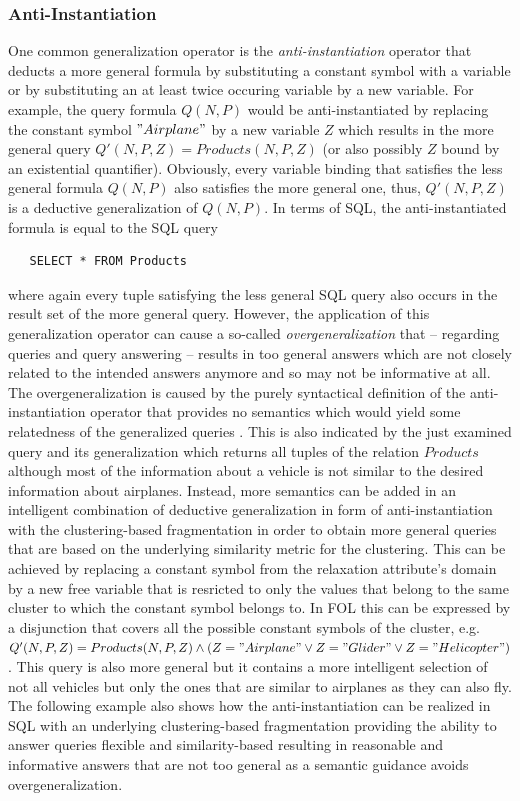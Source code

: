 \subsubsection{Anti-Instantiation}
\label{sec:meth_fqa_anti}
One common generalization operator is the \emph{anti-instantiation} operator \citep{Wiese2014} that deducts a more general formula by substituting a
constant symbol with a variable or by substituting an at least twice occuring variable by a new variable. For example, the query formula $Q(N,P)$ would 
be anti-instantiated by replacing the constant symbol $"Airplane"$ by a new variable $Z$ which results in the more general query
$Q'(N,P,Z)=Products(N,P,Z)$ (or also possibly $Z$ bound by an existential quantifier). Obviously, every variable binding that satisfies the less general
formula $Q(N,P)$ also satisfies the more general one, thus, $Q'(N,P,Z)$ is a deductive generalization of $Q(N,P)$. In terms of SQL, the anti-instantiated
formula is equal to the SQL query 
\begin{verbatim}
   SELECT * FROM Products 
\end{verbatim}
where again every tuple satisfying the less general SQL query also occurs in the result set of the more general query. However, the application of this
generalization operator can cause a so-called \emph{overgeneralization} \citep{Wiese2014} that -- regarding queries and query answering -- results in 
too general answers which are not closely related to the intended answers anymore and so may not be informative at all. The overgeneralization is caused by
the purely syntactical definition of the anti-instantiation operator that provides no semantics which would yield some relatedness of the generalized 
queries \citep{Wiese2014}. This is also indicated by the just examined query and its generalization which returns all tuples of the relation $Products$
although most of the information about a vehicle is not similar to the desired information about airplanes. Instead, more semantics can be added in an
intelligent combination of deductive generalization in form of anti-instantiation with the clustering-based fragmentation in order to obtain more general
queries that are based on the underlying similarity metric for the clustering. This can be achieved by replacing a constant symbol from the relaxation
attribute's domain by a new free variable that is resricted to only the values that belong to the same cluster to which the constant symbol belongs to. 
In FOL this can be expressed by a disjunction that covers all the possible constant symbols of the cluster, e.g. $Q'(N,P,Z)=Products(N,P,Z) \land
(Z="Airplane" \lor Z="Glider" \lor Z="Helicopter")$. This query is also more general but it contains a more intelligent selection of not all vehicles but
only the ones that are similar to airplanes as they can also fly. The following example also shows how the anti-instantiation can be realized in SQL with 
an underlying clustering-based fragmentation providing the ability to answer queries flexible and similarity-based resulting in reasonable and informative
answers that are not too general as a semantic guidance \citep{Wiese2014} avoids overgeneralization.

